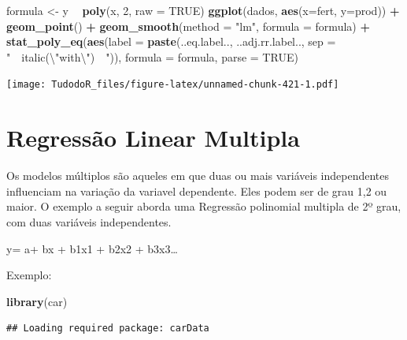 \documentclass[
]{book}
\newenvironment{Shaded}{\begin{snugshade}}{\end{snugshade}}
\newcommand{\CharTok}[1]{\textcolor[rgb]{0.31,0.60,0.02}{#1}}
\newcommand{\DataTypeTok}[1]{\textcolor[rgb]{0.13,0.29,0.53}{#1}}
\newcommand{\DecValTok}[1]{\textcolor[rgb]{0.00,0.00,0.81}{#1}}
\newcommand{\KeywordTok}[1]{\textcolor[rgb]{0.13,0.29,0.53}{\textbf{#1}}}
\newcommand{\NormalTok}[1]{#1}
\newcommand{\OperatorTok}[1]{\textcolor[rgb]{0.81,0.36,0.00}{\textbf{#1}}}
\newcommand{\OtherTok}[1]{\textcolor[rgb]{0.56,0.35,0.01}{#1}}
\newcommand{\StringTok}[1]{\textcolor[rgb]{0.31,0.60,0.02}{#1}}
\begin{document}
\begin{Shaded}
\begin{Highlighting}[]
\NormalTok{ formula <-}\StringTok{ }\NormalTok{y }\OperatorTok{~}\StringTok{ }\KeywordTok{poly}\NormalTok{(x, }\DecValTok{2}\NormalTok{, }\DataTypeTok{raw =} \OtherTok{TRUE}\NormalTok{)}
 \KeywordTok{ggplot}\NormalTok{(dados, }\KeywordTok{aes}\NormalTok{(}\DataTypeTok{x=}\NormalTok{fert, }\DataTypeTok{y=}\NormalTok{prod)) }\OperatorTok{+}
\StringTok{   }\KeywordTok{geom_point}\NormalTok{() }\OperatorTok{+}
\StringTok{   }\KeywordTok{geom_smooth}\NormalTok{(}\DataTypeTok{method =} \StringTok{"lm"}\NormalTok{, }\DataTypeTok{formula =}\NormalTok{ formula) }\OperatorTok{+}
\StringTok{   }\KeywordTok{stat_poly_eq}\NormalTok{(}\KeywordTok{aes}\NormalTok{(}\DataTypeTok{label =}  \KeywordTok{paste}\NormalTok{(..eq.label.., ..adj.rr.label.., }
     \DataTypeTok{sep =} \StringTok{"~~italic(}\CharTok{\textbackslash{}"}\StringTok{with}\CharTok{\textbackslash{}"}\StringTok{)~~"}\NormalTok{)),}
     \DataTypeTok{formula =}\NormalTok{ formula, }\DataTypeTok{parse =} \OtherTok{TRUE}\NormalTok{)}
\end{Highlighting}
\end{Shaded}

\texttt{[image: TudodoR\_files/figure-latex/unnamed-chunk-421-1.pdf]}

\hypertarget{regressuxe3o-linear-multipla}{%
\section{Regressão Linear Multipla}\label{regressuxe3o-linear-multipla}}

Os modelos múltiplos são aqueles em que duas ou mais variáveis independentes influenciam na variação da variavel dependente. Eles podem ser de grau 1,2 ou maior. O exemplo a seguir aborda uma Regressão polinomial multipla de 2º grau, com duas variáveis independentes.

y= a+ bx + b1x1 + b2x2 + b3x3\ldots{}

Exemplo:

\begin{Shaded}
\begin{Highlighting}[]
\KeywordTok{library}\NormalTok{(car)}
\end{Highlighting}
\end{Shaded}

\begin{verbatim}
## Loading required package: carData
\end{verbatim}
\end{document}
